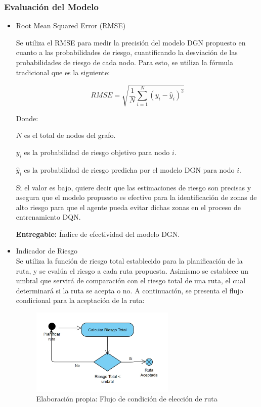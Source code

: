 \subsubsection{Evaluación del Modelo}
\begin{itemize}
	\item Root Mean Squared Error (RMSE)
	
	Se utiliza el RMSE para medir la precisión del modelo DGN propuesto en cuanto a las probabilidades de riesgo, cuantificando la desviación de las probabilidades de riesgo de cada nodo. Para esto, se utiliza la fórmula tradicional que es la siguiente:
	
\begin{equation} 
	RMSE = \sqrt{\frac{1}{N}\sum_{i=1}^{N}(y_{i}-\hat{y}_{i})^{2}}
\end{equation}
	
Donde:

$N$ es el total de nodos del grafo.

$y_{i}$ es la probabilidad de riesgo objetivo para nodo $i$.
	
$\hat{y}_{i}$ es la probabilidad de riesgo predicha por el modelo DGN para nodo $i$.
	
	Si el valor es bajo, quiere decir que las estimaciones de riesgo son precisas y asegura que el modelo propuesto es efectivo para la identificación de zonas de alto riesgo para que el agente pueda evitar dichas zonas en el proceso de entrenamiento DQN.
	
\textbf{Entregable:} Índice de efectividad del modelo DGN.
	\item Indicador de Riesgo \\
	Se utiliza la función de riesgo total establecido para la planificación de la ruta, y se evalúa el riesgo a cada ruta propuesta. Asimismo se establece un umbral que servirá de comparación con el riesgo total de una ruta, el cual determinará si la ruta se acepta o no. A continuación, se presenta el flujo condicional para la aceptación de la ruta:
	
	\begin{figure}[h]
		\begin{center}
			\includegraphics[width=0.65\textwidth]{3/figures/flujoCONDI.jpg}
			\caption[Elaboración propia: Flujo de condición de elección de ruta]{Elaboración propia: Flujo de condición de elección de ruta}
			\label{1:fig}
		\end{center}
	\end{figure}
	

\end{itemize}
